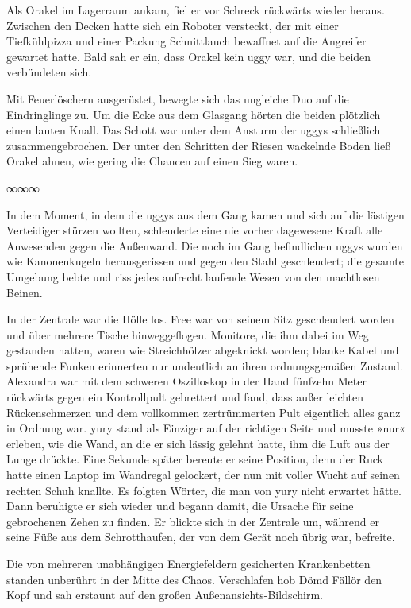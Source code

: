 Als Orakel im Lagerraum ankam, fiel er vor Schreck rückwärts wieder heraus. Zwischen den Decken hatte sich ein Roboter versteckt, der mit einer Tiefkühlpizza und einer Packung Schnittlauch bewaffnet auf die Angreifer gewartet hatte. Bald sah er ein, dass Orakel kein uggy war, und die beiden verbündeten sich.

Mit Feuerlöschern ausgerüstet, bewegte sich das ungleiche Duo auf die Eindringlinge zu. Um die Ecke aus dem Glasgang hörten die beiden plötzlich einen lauten Knall. Das Schott war unter dem Ansturm der uggys schließlich zusammengebrochen. Der unter den Schritten der Riesen wackelnde Boden ließ Orakel ahnen, wie gering die Chancen auf einen Sieg waren.

\begin{center}
    ∞∞∞
\end{center}

In dem Moment, in dem die uggys aus dem Gang kamen und sich auf die lästigen Verteidiger stürzen wollten, schleuderte eine nie vorher dagewesene Kraft alle Anwesenden gegen die Außenwand. Die noch im Gang befindlichen uggys wurden wie Kanonenkugeln herausgerissen und gegen den Stahl geschleudert; die gesamte Umgebung bebte und riss jedes aufrecht laufende Wesen von den machtlosen Beinen.

In der Zentrale war die Hölle los. Free war von seinem Sitz geschleudert worden und über mehrere Tische hinweggeflogen. Monitore, die ihm dabei im Weg gestanden hatten, waren wie Streichhölzer abgeknickt worden; blanke Kabel und sprühende Funken erinnerten nur undeutlich an ihren ordnungsgemäßen Zustand. Alexandra war mit dem schweren Oszilloskop in der Hand fünfzehn Meter rückwärts gegen ein Kontrollpult gebrettert und fand, dass außer leichten Rückenschmerzen und dem vollkommen zertrümmerten Pult eigentlich alles ganz in Ordnung war. yury stand als Einziger auf der richtigen Seite und musste »nur« erleben, wie die Wand, an die er sich lässig gelehnt hatte, ihm die Luft aus der Lunge drückte. Eine Sekunde später bereute er seine Position, denn der Ruck hatte einen Laptop im Wandregal gelockert, der nun mit voller Wucht auf seinen rechten Schuh knallte. Es folgten Wörter, die man von yury nicht erwartet hätte. Dann beruhigte er sich wieder und begann damit, die Ursache für seine gebrochenen Zehen zu finden. Er blickte sich in der Zentrale um, während er seine Füße aus dem Schrotthaufen, der von dem Gerät noch übrig war, befreite.

Die von mehreren unabhängigen Energiefeldern gesicherten Krankenbetten standen unberührt in der Mitte des Chaos. Verschlafen hob Dömd Fällör den Kopf und sah erstaunt auf den großen Außenansichts-Bildschirm.

